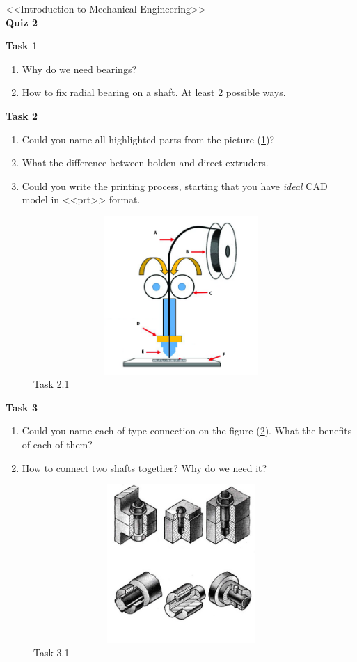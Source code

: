 \documentclass[12pt]{article}
\newcommand\pic[1]{(\cref{#1})} %
\begin{document}
\begin{center}
    \LARGE <<Introduction to Mechanical Engineering>> \\ \textbf{Quiz 2}
\end{center}


\textbf{Task 1}
\begin{enumerate}
    \item Why do we need bearings?
    \item How to fix radial bearing on a shaft. At least 2 possible ways.
\end{enumerate}

\textbf{Task 2}
\begin{enumerate}
    \item Could you name all highlighted parts from the picture \pic{fig:resources_quiz_2/quiz1_task2.png}?
    \item What the difference between bolden and direct extruders.
    \item Could you write the printing process, starting that you have \textit{ideal} CAD model in <<prt>> format.  
\end{enumerate}
\begin{figure}[H]
    \centering\includegraphics[height=6cm,width=1\textwidth,keepaspectratio]{resources_quiz_2/quiz1_task5.png}
    \caption{Task 2.1}
    \label{fig:resources_quiz_2/quiz1_task2.png}
\end{figure}


\textbf{Task 3}
\begin{enumerate}
    \item Could you name each of type connection on the figure \pic{fig:detach.jpg}. What the benefits of each of them? 
    \item How to connect two shafts together? Why do we need it? 
\end{enumerate}

\begin{figure}[H]
    \centering\includegraphics[height=6cm,width=1\textwidth,keepaspectratio]{detach.jpg}
    \caption{Task 3.1}
    \label{fig:detach.jpg}
\end{figure}
\end{document}
